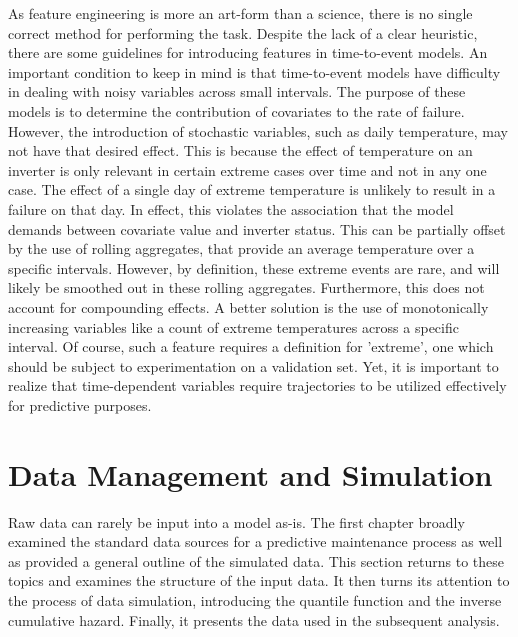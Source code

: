 As feature engineering is more an art-form than a science, there is no single correct method for performing the task. Despite the lack of a clear heuristic, there are some guidelines for introducing features in time-to-event models. An important condition to keep in mind is that time-to-event models have difficulty in dealing with noisy variables across small intervals. The purpose of these models is to determine the contribution of covariates to the rate of failure. However, the introduction of stochastic variables, such as daily temperature, may not have that desired effect. This is because the effect of temperature on an inverter is only relevant in certain extreme cases over time and not in any one case. The effect of a single day of extreme temperature is unlikely to result in a failure on that day. In effect, this violates the association that the model demands between covariate value and inverter status. This can be partially offset by the use of rolling aggregates, that provide an average temperature over a specific intervals. However, by definition, these extreme events are rare, and will likely be smoothed out in these rolling aggregates. Furthermore, this does not account for compounding effects. A better solution is the use of monotonically increasing variables like a count of extreme temperatures across a specific interval. Of course, such a feature requires a definition for 'extreme', one which should be subject to experimentation on a validation set. Yet, it is important to realize that time-dependent variables require trajectories to be utilized effectively for predictive purposes. 






\section*{Data Management and Simulation}

Raw data can rarely be input into a model as-is. The first chapter broadly examined the standard data sources for a predictive maintenance process as well as provided a general outline of the simulated data. This section returns to these topics and examines the structure of the input data. It then turns its attention to the process of data simulation, introducing the quantile function and the inverse cumulative hazard. Finally, it presents the data used in the subsequent analysis.


